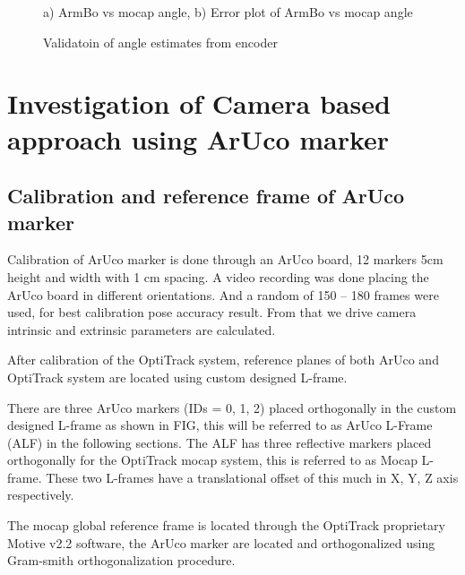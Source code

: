 \documentclass[12pt, twoside]{report}
\begin{document}
\begin{figure}[h!]
    \centering
    \caption{Validatoin of angle estimates from encoder}
    {a) ArmBo vs mocap angle, b) Error plot of ArmBo vs mocap angle}
    \label{fig:enc_theta}
\end{figure}

\section{Investigation of Camera based approach using ArUco marker}

\subsection{Calibration and reference frame of ArUco marker}

Calibration of ArUco marker is done through an ArUco board,
12 markers 5cm height and width with 1 cm spacing.
A video recording was done placing the ArUco board in different
orientations. And a random of 150 – 180 frames were used,
for best calibration pose accuracy result.
From that we drive camera intrinsic and extrinsic parameters are
calculated.


After calibration of the OptiTrack system, reference planes of both
ArUco and OptiTrack system are located using custom designed L-frame.

There are three ArUco markers (IDs = 0, 1, 2) placed orthogonally
in the custom designed L-frame as shown in FIG,
this will be referred to as ArUco L-Frame (ALF) in the
following sections. The ALF has three reflective markers
placed orthogonally for the OptiTrack mocap system, this is
referred to as Mocap L-frame. These two L-frames have a translational
offset of this much in X, Y, Z axis respectively.

The mocap global reference frame is located through
the OptiTrack proprietary Motive v2.2 software,
the ArUco marker are located and
orthogonalized using Gram-smith orthogonalization procedure.
\end{document}
